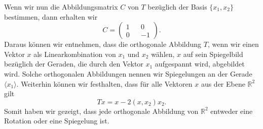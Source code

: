 Wenn wir nun die Abbildungsmatrix $C$ von $T$ bezüglich der Basis $\{x_1,x_2\}$ bestimmen, dann erhalten wir
$$C = \begin{pmatrix}
	1 && 0 \\
	0 && -1
\end{pmatrix}.$$
Daraus können wir entnehmen, dass die orthogonale Abbildung $T$, wenn wir einen Vektor $x$ als Linearkombination von $x_1$ und $x_2$ wählen, $x$ auf sein Spiegelbild bezüglich der Geraden, die durch den Vektor $x_1$ aufgespannt wird, abgebildet wird. Solche orthogonalen Abbildungen nennen wir Spiegelungen an der Gerade $\langle x_1 \rangle$. Weiterhin können wir festhalten, dass für alle Vektoren $x$ aus der Ebene $\mathbb{R}^2$ gilt
$$Tx = x - 2(x,x_2)x_2.$$
Somit haben wir gezeigt, dass jede orthogonale Abbildung von $\mathbb{R}^2$ entweder eine Rotation oder eine Spiegelung ist.

